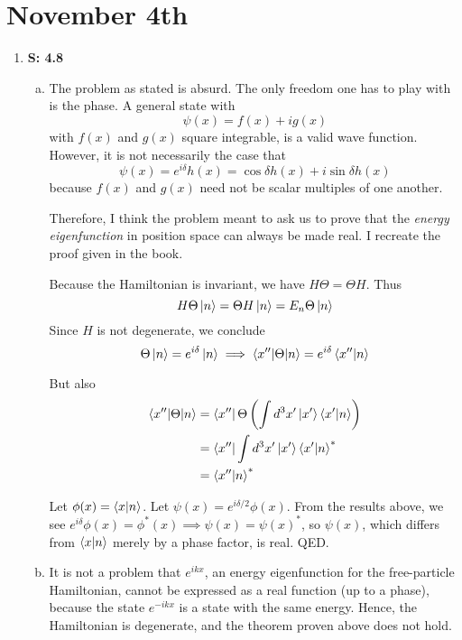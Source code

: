 \documentclass[12pt, letterpaper]{article}
\begin{document}
\section*{November 4th}
\begin{enumerate}
    \item[] \textbf{S: 4.8}
    
    \begin{enumerate}[(a)]
        \item The problem as stated is absurd. The only freedom one has to play with is the phase. A general state with
        \begin{equation}
            \psi(x)=f(x)+ig(x)
        \end{equation}
        with $f(x)$ and $g(x)$ square integrable, is a valid wave function. However, it is not necessarily the case that 
        \begin{equation}
            \psi(x)=e^{i\delta}h(x)=\cos{\delta}h(x)+i\sin{\delta}h(x)
        \end{equation}
        because $f(x)$ and $g(x)$ need not be scalar multiples of one another. 
        
        Therefore, I think the problem meant to ask us to prove that the \textit{energy eigenfunction} in position space can always be made real. I recreate the proof given in the book.
        
        Because the Hamiltonian is invariant, we have $H\Theta=\Theta H$. Thus
        \begin{equation}
            H\Theta \ket{n}=\Theta H\ket{n}=E_n\Theta \ket{n}
        \end{equation}
        Since $H$ is not degenerate, we conclude
        \begin{equation}
            \Theta \ket{n}=e^{i\delta} \ket{n}\implies \braket{x''|\Theta|n}=e^{i\delta}\braket{x''|n}
        \end{equation}
        
        But also
        \begin{align}
            \braket{x''|\Theta|n}&=\bra{x''}\Theta\left(\int d^3x' \ket{x'}\braket{x'|n} \right)\\&=\bra{x''}\int d^3 x' \ket{x'}\braket{x'|n}^*\\&=\braket{x''|n}^*
        \end{align}
        
        Let $\phi(x)=\braket{x|n}$. Let $\psi(x)=e^{i\delta/2}\phi(x)$. From the results above, we see $e^{i\delta}\phi(x)=\phi^*(x)\implies \psi(x)=\psi(x)^*$, so $\psi(x)$, which differs from $\braket{x|n}$ merely by a phase factor, is real. QED.
        \item
        It is not a problem that $e^{ikx}$, an energy eigenfunction for the free-particle Hamiltonian, cannot be expressed as a real function (up to a phase), because the state $e^{-ikx}$ is a state with the same energy. Hence, the Hamiltonian is degenerate, and the theorem proven above does not hold.


\end{enumerate}
\end{enumerate}
\end{document}
